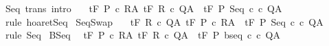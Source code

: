 \begin{isabellebody}
\ Seq\ {\isacharbrackleft}trans{\isacharcomma}\ intro{\isacharquery}{\isacharbrackright}{\isacharcolon}\ \isanewline
\ \ {\isachardoublequoteopen}{\isasymlbrakk}{\isasymGamma}{\isacharcomma}{\isasymTheta}{\isasymturnstile}\isactrlsub t\isactrlbsub {\isacharslash}F\isactrlesub \ P\ c\ R{\isacharcomma}A{\isacharsemicolon}\ {\isasymGamma}{\isacharcomma}{\isasymTheta}{\isasymturnstile}\isactrlsub t\isactrlbsub {\isacharslash}F\isactrlesub \ R\ c\ Q{\isacharcomma}A{\isasymrbrakk}\ {\isasymLongrightarrow}\ {\isasymGamma}{\isacharcomma}{\isasymTheta}{\isasymturnstile}\isactrlsub t\isactrlbsub {\isacharslash}F\isactrlesub \ P\ Seq\ c\ c\ Q{\isacharcomma}A{\isachardoublequoteclose}\isanewline
%
\isadelimproof
\ \ %
\endisadelimproof
%
\isatagproof
{}\isamarkupfalse%
\ {\isacharparenleft}rule\ hoaret{\isachardot}Seq{\isacharparenright}%
\endisatagproof
{\isafoldproof}%
%
\isadelimproof
\isanewline
%
\endisadelimproof
\isanewline
{}\isamarkupfalse%
\ SeqSwap{\isacharcolon}\ \isanewline
\ \ {\isachardoublequoteopen}{\isasymlbrakk}{\isasymGamma}{\isacharcomma}{\isasymTheta}{\isasymturnstile}\isactrlsub t\isactrlbsub {\isacharslash}F\isactrlesub \ R\ c{}\ Q{\isacharcomma}A{\isacharsemicolon}\ {\isasymGamma}{\isacharcomma}{\isasymTheta}{\isasymturnstile}\isactrlsub t\isactrlbsub {\isacharslash}F\isactrlesub \ P\ c{}\ R{\isacharcomma}A{\isasymrbrakk}\ {\isasymLongrightarrow}\ {\isasymGamma}{\isacharcomma}{\isasymTheta}{\isasymturnstile}\isactrlsub t\isactrlbsub {\isacharslash}F\isactrlesub \ P\ Seq\ c{}\ c{}\ Q{\isacharcomma}A{\isachardoublequoteclose}\isanewline
%
\isadelimproof
\ \ %
\endisadelimproof
%
\isatagproof
{}\isamarkupfalse%
\ {\isacharparenleft}rule\ Seq{\isacharparenright}%
\endisatagproof
{\isafoldproof}%
%
\isadelimproof
\isanewline
%
\endisadelimproof
\isanewline
{}\isamarkupfalse%
\ BSeq{\isacharcolon}\isanewline
\ \ {\isachardoublequoteopen}{\isasymlbrakk}{\isasymGamma}{\isacharcomma}{\isasymTheta}{\isasymturnstile}\isactrlsub t\isactrlbsub {\isacharslash}F\isactrlesub \ P\ c\ R{\isacharcomma}A{\isacharsemicolon}\ {\isasymGamma}{\isacharcomma}{\isasymTheta}{\isasymturnstile}\isactrlsub t\isactrlbsub {\isacharslash}F\isactrlesub \ R\ c\ Q{\isacharcomma}A{\isasymrbrakk}\ {\isasymLongrightarrow}\ {\isasymGamma}{\isacharcomma}{\isasymTheta}{\isasymturnstile}\isactrlsub t\isactrlbsub {\isacharslash}F\isactrlesub \ P\ {\isacharparenleft}bseq\ c\ c\ Q{\isacharcomma}A{\isachardoublequoteclose}\isanewline

\end{isabellebody}
